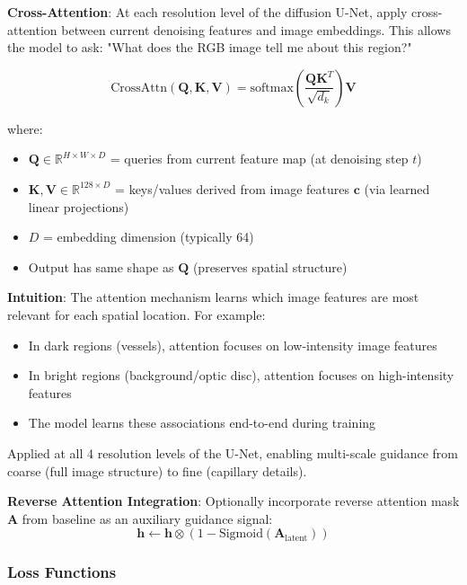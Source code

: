 \documentclass[11pt]{article}
\begin{document}
\textbf{Cross-Attention}:
At each resolution level of the diffusion U-Net, apply cross-attention between current denoising features and image embeddings. This allows the model to ask: "What does the RGB image tell me about this region?"

\begin{equation}
\text{CrossAttn}(\mathbf{Q}, \mathbf{K}, \mathbf{V}) = \text{softmax}\left(\frac{\mathbf{Q}\mathbf{K}^T}{\sqrt{d_k}}\right)\mathbf{V}
\end{equation}

where:
\begin{itemize}
    \item $\mathbf{Q} \in \mathbb{R}^{H \times W \times D}$ = queries from current feature map (at denoising step $t$)
    \item $\mathbf{K}, \mathbf{V} \in \mathbb{R}^{128 \times D}$ = keys/values derived from image features $\mathbf{c}$ (via learned linear projections)
    \item $D$ = embedding dimension (typically 64)
    \item Output has same shape as $\mathbf{Q}$ (preserves spatial structure)
\end{itemize}

\textbf{Intuition}: The attention mechanism learns which image features are most relevant for each spatial location. For example:
\begin{itemize}
    \item In dark regions (vessels), attention focuses on low-intensity image features
    \item In bright regions (background/optic disc), attention focuses on high-intensity features
    \item The model learns these associations end-to-end during training
\end{itemize}

Applied at all 4 resolution levels of the U-Net, enabling multi-scale guidance from coarse (full image structure) to fine (capillary details).

\textbf{Reverse Attention Integration}:
Optionally incorporate reverse attention mask $\mathbf{A}$ from baseline as an auxiliary guidance signal:
\begin{equation}
\mathbf{h} \gets \mathbf{h} \otimes (1 - \text{Sigmoid}(\mathbf{A}_{\text{latent}}))
\end{equation}

\subsubsection{Loss Functions}
\end{document}
